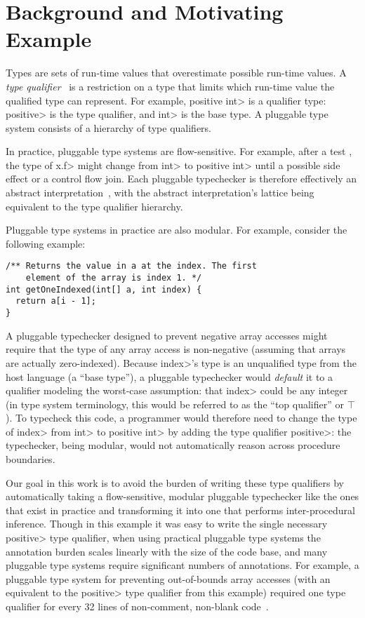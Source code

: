 \section{Background and Motivating Example}
\label{sec:motivating-example}

Types are sets of run-time values that
overestimate possible run-time values. 
A \textit{type qualifier}~\cite{FosterFFA99}
is a restriction on a type that limits which run-time value
the qualified type can represent. For example, \<positive int>
is a qualifier type: \<positive> is the type qualifier, and \<int>
is the base type.
%
A pluggable type system consists of a hierarchy of type qualifiers.

In practice, pluggable type systems are flow-sensitive.
For example, after a test , the type of \<x.f>
might change from \<int> to \<positive int>
until a possible side effect or a control flow join.
%
Each pluggable typechecker is therefore effectively
an abstract interpretation~\cite{Cousot1997}, with the
abstract interpretation's lattice being equivalent to
the type qualifier hierarchy.

Pluggable type systems in practice are also modular.
For example, consider the following example:

\begin{verbatim}
/** Returns the value in a at the index. The first
    element of the array is index 1. */
int getOneIndexed(int[] a, int index) {
  return a[i - 1];
}
\end{verbatim}

A pluggable typechecker designed to prevent negative array accesses
might require that the type of any array access is non-negative
(assuming that arrays are actually zero-indexed).
%
Because \<index>'s type is an unqualified type from the host language
(\ie a ``base type''),
a pluggable typechecker would \emph{default}
it to a qualifier modeling the worst-case assumption: that \<index> could
be any integer (in type system terminology, this would be referred to
as the ``top qualifier'' or $\top$).
%
To typecheck this code,
a programmer would therefore need to change the type of \<index> from
\<int> to \<positive int> by adding the type qualifier \<positive>:
the typechecker, being modular, would not automatically reason across procedure boundaries.

Our goal in this work is to avoid the burden of writing these type qualifiers
by automatically taking a flow-sensitive, modular pluggable typechecker
like the ones that exist in practice and transforming it into one that performs
inter-procedural inference. Though in this example it was easy to write
the single necessary \<positive> type qualifier, when using practical pluggable
type systems the annotation burden scales linearly with the size of the code
base, and many pluggable type systems require significant numbers of annotations.
For example, a pluggable type system for preventing out-of-bounds array accesses
(with an equivalent to the \<positive> type qualifier from this example) required
one type qualifier for every 32 lines of non-comment, non-blank code~\cite{KelloggDME2018}.
